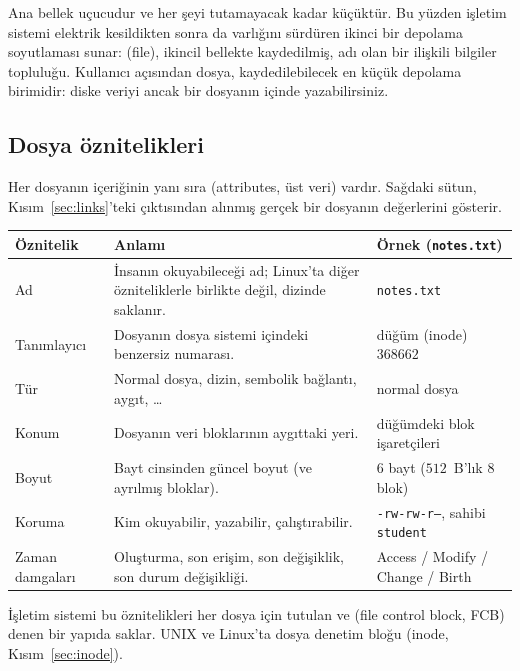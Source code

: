 Ana bellek uçucudur ve her şeyi tutamayacak kadar küçüktür. Bu yüzden işletim sistemi elektrik kesildikten sonra da varlığını sürdüren ikinci bir depolama soyutlaması sunar:  (file), ikincil bellekte kaydedilmiş, adı olan bir ilişkili bilgiler topluluğu. Kullanıcı açısından dosya, kaydedilebilecek en küçük depolama birimidir: diske veriyi ancak bir dosyanın içinde yazabilirsiniz.

\subsection{Dosya öznitelikleri}

Her dosyanın içeriğinin yanı sıra  (attributes, üst veri) vardır. Sağdaki sütun, Kısım~\ref{sec:links}'teki  çıktısından alınmış gerçek bir dosyanın değerlerini gösterir.

\begin{center}
\renewcommand{\arraystretch}{1.3}
\begin{tabularx}{\linewidth}{>{\raggedright\arraybackslash}p{2.6cm} >{\raggedright\arraybackslash}X >{\raggedright\arraybackslash}p{4.4cm}}
\toprule
\textbf{Öznitelik} & \textbf{Anlamı} & \textbf{Örnek (\texttt{notes.txt})} \\
\midrule
Ad & İnsanın okuyabileceği ad; Linux'ta diğer özniteliklerle birlikte değil, dizinde saklanır. & \texttt{notes.txt} \\
Tanımlayıcı & Dosyanın dosya sistemi içindeki benzersiz numarası. & düğüm (inode) $368662$ \\
Tür & Normal dosya, dizin, sembolik bağlantı, aygıt, \dots & normal dosya \\
Konum & Dosyanın veri bloklarının aygıttaki yeri. & düğümdeki blok işaretçileri \\
Boyut & Bayt cinsinden güncel boyut (ve ayrılmış bloklar). & $6$ bayt ($512$~B'lık $8$ blok) \\
Koruma & Kim okuyabilir, yazabilir, çalıştırabilir. & \texttt{-rw-rw-r--}, sahibi \texttt{student} \\
Zaman damgaları & Oluşturma, son erişim, son değişiklik, son durum değişikliği. & Access / Modify / Change / Birth \\
\bottomrule
\end{tabularx}
\end{center}

İşletim sistemi bu öznitelikleri her dosya için tutulan ve  (file control block, FCB) denen bir yapıda saklar. UNIX ve Linux'ta dosya denetim bloğu  (inode, Kısım~\ref{sec:inode}).

